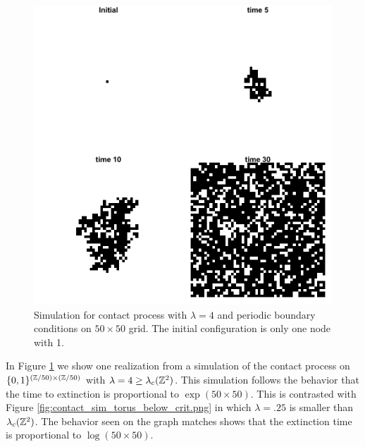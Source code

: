 \begin{figure}[H]
  \centering
    \includegraphics[width=.80\textwidth]{figures/contact_simulation_torus_25.png}
   \caption{Simulation for contact process with $\lambda = 4$ and periodic boundary conditions on $50 \times 50$ grid. The initial configuration is only one node with 1.}
  \label{fig:contact_sim_torus_above_crit.png}
\end{figure}

In Figure \ref{fig:contact_sim_torus_above_crit.png} we show one realization from a simulation of the contact process on $\{0,1\}^{(\mathbb{Z}/50) \times (\mathbb{Z}/50)}$ with $\lambda = 4 \geq \lambda_c(\mathbb{Z}^2)$.
This simulation follows the behavior that the time to extinction is proportional to $\exp(50 \times 50)$.
This is contrasted with Figure \ref{fig:contact_sim_torus_below_crit.png} in which $\lambda = .25$ is smaller than $\lambda_c(\mathbb{Z}^2)$.
The behavior seen on the graph matches shows that the extinction time is proportional to $\log(50 \times 50)$.

